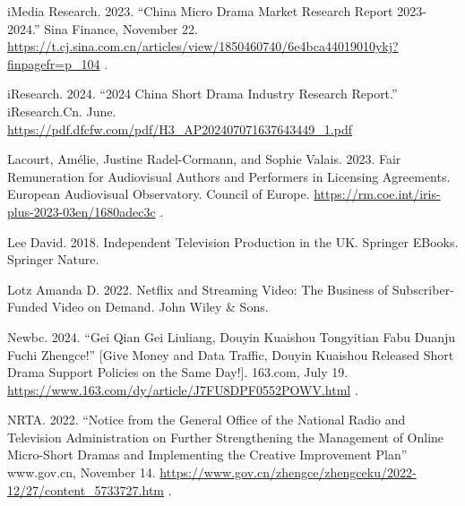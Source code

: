 \documentclass[10pt,a4paper]{article}
\begin{document}
\noindent\begin{minipage}{\linewidth}iMedia Research. 2023. “China Micro Drama Market Research Report 2023-2024.” Sina Finance, November 22. \url{https://t.cj.sina.com.cn/articles/view/1850460740/6e4bca44019010ykj?finpagefr=p_104} .\par\end{minipage}\par
\noindent\begin{minipage}{\linewidth}iResearch. 2024. “2024 China Short Drama Industry Research Report.” iResearch.Cn. June. \url{https://pdf.dfcfw.com/pdf/H3_AP202407071637643449_1.pdf}\par\end{minipage}\par
\noindent\begin{minipage}{\linewidth}Lacourt, Amélie, Justine Radel-Cormann, and Sophie Valais. 2023. Fair Remuneration for Audiovisual Authors and Performers in Licensing Agreements. European Audiovisual Observatory. Council of Europe. \url{https://rm.coe.int/iris-plus-2023-03en/1680adec3c} .\par\end{minipage}\par
\noindent\begin{minipage}{\linewidth}Lee David. 2018. Independent Television Production in the UK. Springer EBooks. Springer Nature.\par\end{minipage}\par
\noindent\begin{minipage}{\linewidth}Lotz Amanda D. 2022. Netflix and Streaming Video: The Business of Subscriber-Funded Video on Demand. John Wiley \& Sons.\par\end{minipage}\par
\noindent\begin{minipage}{\linewidth}Newbc. 2024. “Gei Qian Gei Liuliang, Douyin Kuaishou Tongyitian Fabu Duanju Fuchi Zhengce!” [Give Money and Data Traffic, Douyin Kuaishou Released Short Drama Support Policies on the Same Day!]. 163.com, July 19. \url{https://www.163.com/dy/article/J7FU8DPF0552POWV.html} .\par\end{minipage}\par
\noindent\begin{minipage}{\linewidth}NRTA. 2022. “Notice from the General Office of the National Radio and Television Administration on Further Strengthening the Management of Online Micro-Short Dramas and Implementing the Creative Improvement Plan” www.gov.cn, November 14. \url{https://www.gov.cn/zhengce/zhengceku/2022-12/27/content_5733727.htm} .\par\end{minipage}\par
\end{document}
